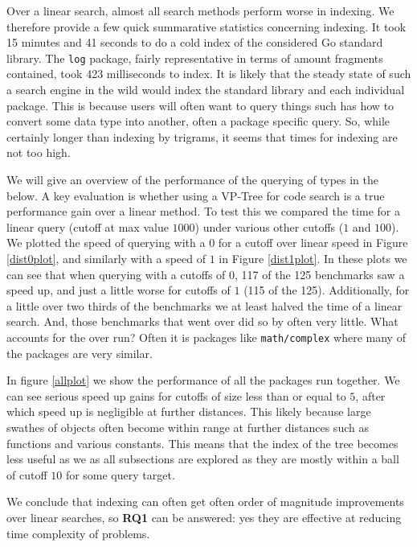 Over a linear search, almost all search methods perform worse in indexing.
We therefore provide a few quick summarative statistics concerning indexing.
It took 15 minutes and 41 seconds to do a cold index of the considered Go standard library.
The \texttt{log} package, fairly representative in terms of amount fragments contained,
took 423 milliseconds to index. 
It is likely that the steady state of such a search engine in the wild would index the standard library and each individual package.
This is because users will often want to query things such has how to convert some data type into another, often a package specific query.
So, while certainly longer than indexing by trigrams, it seems that times for indexing are not too high.

We will give an overview of the performance of the querying of types in the below.
A key evaluation is whether using a VP-Tree for code search is a true performance gain over a linear method.
To test this we compared the time for a linear query (cutoff at max value $1000$) under various other cutoffs ($1$ and $100$).
We plotted the speed of querying with a $0$ for a cutoff over linear speed in Figure \ref{dist0plot},
and similarly with a speed of $1$ in Figure \ref{dist1plot}.
In these plots we can see that when querying with a cutoffs of $0$, 117 of the 125 benchmarks saw a speed up,
and just a little worse for cutoffs of $1$ (115 of the 125).
Additionally, for a little over two thirds of the benchmarks we at least halved the time of a linear search.
And, those benchmarks that went over did so by often very little.
What accounts for the over run?
Often it is packages like \texttt{math/complex} where many of the packages are very similar.

In figure \ref{allplot} we show the performance of all the packages run together.
We can see serious speed up gains for cutoffs of size less than or equal to $5$,
after which speed up is negligible at further distances.
This likely because large swathes of objects often become within range at further distances such as functions and various constants.
This means that the index of the tree becomes less useful as we as all subsections are explored as they are mostly within 
a ball of cutoff $10$ for some query target. 

We conclude that indexing can often get often order of magnitude improvements over linear searches,
so \textbf{RQ1} can be answered: 
yes they are effective at reducing time complexity of problems.

